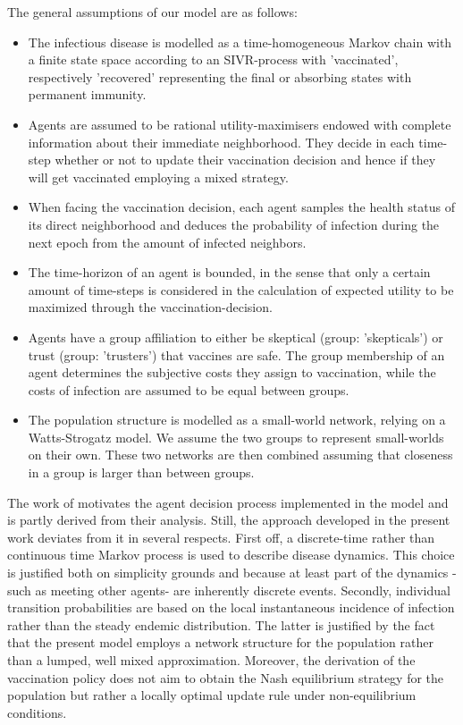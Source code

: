 \documentclass[11pt]{article}
\begin{document}

The general assumptions of our model are as follows:
\begin{itemize}
\item{The infectious disease is modelled as a time-homogeneous Markov chain with a finite state space according to an SIVR-process with 'vaccinated', respectively 'recovered' representing the final or absorbing states with permanent immunity.}
\item{Agents are assumed to be rational utility-maximisers endowed with complete information about their immediate neighborhood. They decide in each time-step whether or not to update their vaccination decision and hence if they will get vaccinated employing a mixed strategy.}
\item{When facing the vaccination decision, each agent samples the health status of its direct neighborhood and deduces the probability of infection during the next epoch from the amount of infected neighbors.}
\item{The time-horizon of an agent is bounded, in the sense that only a certain amount of time-steps is considered in the calculation of expected utility to be maximized through the vaccination-decision.}
\item{Agents have a group affiliation to either be skeptical (group: 'skepticals') or trust (group: 'trusters') that vaccines are safe. The group membership of an agent determines the subjective costs they assign to vaccination, while the costs of infection are assumed to be equal between groups.}
\item{The population structure is modelled as a small-world network, relying on a Watts-Strogatz model. We assume the two groups to represent small-worlds on their own. These two networks are then combined assuming that closeness in a group is larger than between groups.}
\end{itemize}
The work of \cite{shim2012} motivates the agent decision process implemented in the model and is partly derived from their analysis. Still, the approach developed in the present work deviates from it in several respects. First off, a discrete-time rather than continuous time Markov process is used to describe disease dynamics. This choice is justified both on simplicity grounds and because at least part of the dynamics -such as meeting other agents- are inherently discrete events. Secondly, individual transition probabilities are based on the local instantaneous incidence of infection rather than the steady endemic distribution. The latter is justified by the fact that the present model employs a network structure for the population rather than a lumped, well mixed approximation. Moreover, the derivation of the vaccination policy does not aim to obtain the Nash equilibrium strategy for the population but rather a locally optimal update rule under non-equilibrium conditions.
\end{document}
